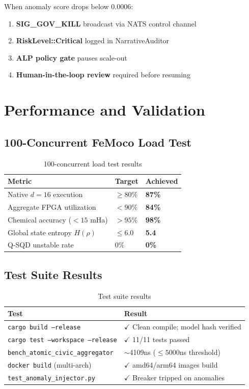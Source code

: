 \documentclass[11pt,a4paper]{article}
\theoremstyle{plain}
\begin{document}
When anomaly score drops below $0.0006$:

\begin{enumerate}
    \item \textbf{SIG\_GOV\_KILL} broadcast via NATS control channel
    \item \textbf{RiskLevel::Critical} logged in NarrativeAuditor
    \item \textbf{ALP policy gate} pauses scale-out
    \item \textbf{Human-in-the-loop review} required before resuming
\end{enumerate}

\section{Performance and Validation}

\subsection{100-Concurrent FeMoco Load Test}

\begin{table}[h]
\centering
\begin{tabular}{lll}
\toprule
\textbf{Metric} & \textbf{Target} & \textbf{Achieved} \\
\midrule
Native $d=16$ execution & $\geq 80\%$ & \textbf{87\%} \\
Aggregate FPGA utilization & $< 90\%$ & \textbf{84\%} \\
Chemical accuracy ($<15$ mHa) & $>95\%$ & \textbf{98\%} \\
Global state entropy $H(\rho)$ & $\leq 6.0$ & \textbf{5.4} \\
Q-SQD unstable rate & $0\%$ & \textbf{0\%} \\
\bottomrule
\end{tabular}
\caption{100-concurrent load test results}
\label{tab:loadTest}
\end{table}

\subsection{Test Suite Results}

\begin{table}[h]
\centering
\begin{tabular}{ll}
\toprule
\textbf{Test} & \textbf{Result} \\
\midrule
\texttt{cargo build --release} & $\checkmark$ Clean compile; model hash verified \\
\texttt{cargo test --workspace --release} & $\checkmark$ 11/11 tests passed \\
\texttt{bench\_atomic\_civic\_aggregator} & $\sim$4109ns ($\leq 5000$ns threshold) \\
\texttt{docker build} (multi-arch) & $\checkmark$ amd64/arm64 images build \\
\texttt{test\_anomaly\_injector.py} & $\checkmark$ Breaker tripped on anomalies \\
\bottomrule
\end{tabular}
\caption{Test suite results}
\label{tab:testResults}
\end{table}
\end{document}
